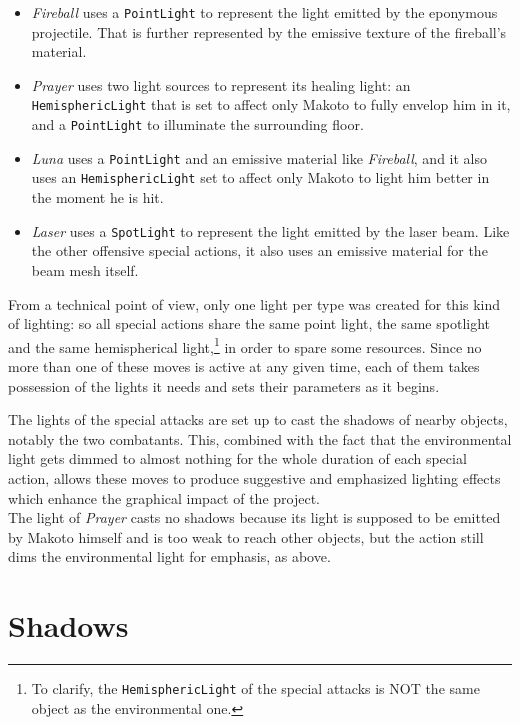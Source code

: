 \begin{itemize}
    \item \textit{Fireball} uses a \texttt{PointLight} to represent the light emitted by the eponymous projectile. That is further represented by the emissive texture of the fireball's material.
    \item \textit{Prayer} uses two light sources to represent its healing light: an \texttt{HemisphericLight} that is set to affect only Makoto to fully envelop him in it, and a \texttt{PointLight} to illuminate the surrounding floor.
    \item \textit{Luna} uses a \texttt{PointLight} and an emissive material like \textit{Fireball}, and it also uses an \texttt{HemisphericLight} set to affect only Makoto to light him better in the moment he is hit.
    \item \textit{Laser} uses a \texttt{SpotLight} to represent the light emitted by the laser beam. Like the other offensive special actions, it also uses an emissive material for the beam mesh itself.
\end{itemize}

From a technical point of view, only one light per type was created for this kind of lighting: so all special actions share the same point light, the same spotlight and the same hemispherical light,\footnote{To clarify, the \texttt{HemisphericLight} of the special attacks is NOT the same object as the environmental one.} in order to spare some resources. Since no more than one of these moves is active at any given time, each of them takes possession of the lights it needs and sets their parameters as it begins.

The lights of the special attacks are set up to cast the shadows of nearby objects, notably the two combatants. This, combined with the fact that the environmental light gets dimmed to almost nothing for the whole duration of each special action, allows these moves to produce suggestive and emphasized lighting effects which enhance the graphical impact of the project.\\
The light of \textit{Prayer} casts no shadows because its light is supposed to be emitted by Makoto himself and is too weak to reach other objects, but the action still dims the environmental light for emphasis, as above.

\section{Shadows}

